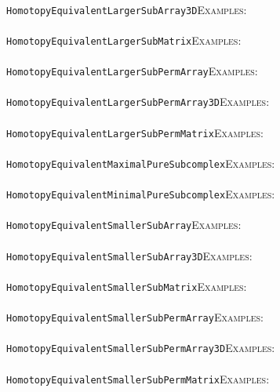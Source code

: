 \documentclass[a4paper,11pt]{report}
\begin{document}
{{ \\
 \texttt{HomotopyEquivalentLargerSubArray3D}{\nobreakspace}{\nobreakspace}{\nobreakspace}{\nobreakspace}\textsc{Examples:} \\
 \\
 \texttt{HomotopyEquivalentLargerSubMatrix}{\nobreakspace}{\nobreakspace}{\nobreakspace}{\nobreakspace}\textsc{Examples:} \\
 \\
 \texttt{HomotopyEquivalentLargerSubPermArray}{\nobreakspace}{\nobreakspace}{\nobreakspace}{\nobreakspace}\textsc{Examples:} \\
 \\
 \texttt{HomotopyEquivalentLargerSubPermArray3D}{\nobreakspace}{\nobreakspace}{\nobreakspace}{\nobreakspace}\textsc{Examples:} \\
 \\
 \texttt{HomotopyEquivalentLargerSubPermMatrix}{\nobreakspace}{\nobreakspace}{\nobreakspace}{\nobreakspace}\textsc{Examples:} \\
 \\
 \texttt{HomotopyEquivalentMaximalPureSubcomplex}{\nobreakspace}{\nobreakspace}{\nobreakspace}{\nobreakspace}\textsc{Examples:} \\
 \\
 \texttt{HomotopyEquivalentMinimalPureSubcomplex}{\nobreakspace}{\nobreakspace}{\nobreakspace}{\nobreakspace}\textsc{Examples:} \\
 \\
 \texttt{HomotopyEquivalentSmallerSubArray}{\nobreakspace}{\nobreakspace}{\nobreakspace}{\nobreakspace}\textsc{Examples:} \\
 \\
 \texttt{HomotopyEquivalentSmallerSubArray3D}{\nobreakspace}{\nobreakspace}{\nobreakspace}{\nobreakspace}\textsc{Examples:} \\
 \\
 \texttt{HomotopyEquivalentSmallerSubMatrix}{\nobreakspace}{\nobreakspace}{\nobreakspace}{\nobreakspace}\textsc{Examples:} \\
 \\
 \texttt{HomotopyEquivalentSmallerSubPermArray}{\nobreakspace}{\nobreakspace}{\nobreakspace}{\nobreakspace}\textsc{Examples:} \\
 \\
 \texttt{HomotopyEquivalentSmallerSubPermArray3D}{\nobreakspace}{\nobreakspace}{\nobreakspace}{\nobreakspace}\textsc{Examples:} \\
 \\
 \texttt{HomotopyEquivalentSmallerSubPermMatrix}{\nobreakspace}{\nobreakspace}{\nobreakspace}{\nobreakspace}\textsc{Examples:} \\
}}
\end{document}
